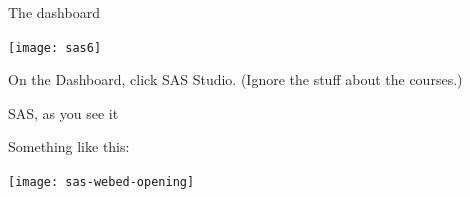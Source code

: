 \documentclass[unknownkeysallowed]{beamer}\usepackage[]{graphicx}\usepackage[]{color}
\begin{document}
\begin{frame}[fragile]{The dashboard}

\texttt{[image: sas6]}

On the Dashboard, click SAS Studio. (Ignore the stuff about the
courses.) 
  
\end{frame}

\begin{frame}[fragile]{SAS, as you see it}

Something like this:

\texttt{[image: sas-webed-opening]}
  
\end{frame}


%
%
%
% 
%
%
%
%
%  
%
%  
%
%
%
%
%
%
%
%
\end{document}
